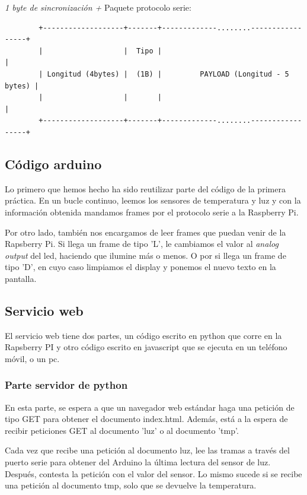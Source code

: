 \documentclass[]{article}
\begin{document}
\textit{1 byte de sincronización +}
Paquete protocolo serie:
\begin{verbatim}
		+-------------------+-------+-------------........-----------------+
		|                   |  Tipo |                                      |
		| Longitud (4bytes) |  (1B) |         PAYLOAD (Longitud - 5 bytes) |
		|                   |       |                                      |
		+-------------------+-------+-------------........-----------------+
\end{verbatim}


\subsection{Código arduino}

Lo primero que hemos hecho ha sido reutilizar parte del código de la primera práctica. En un bucle continuo, leemos los sensores de temperatura y luz y con la información obtenida mandamos frames por el protocolo serie a la Raspberry Pi.

\hfill

Por otro lado, también nos encargamos de leer frames que puedan venir de la Rapsberry Pi. Si llega un frame de tipo 'L', le cambiamos el valor al \textit{analog output} del led, haciendo que ilumine más o menos. O por si llega un frame de tipo 'D', en cuyo caso limpiamos el display y ponemos el nuevo texto en la pantalla.

\subsection{Servicio web}
El servicio web tiene dos partes, un código escrito en python que corre en la Rapsberry PI y otro código escrito en javascript que se ejecuta en un teléfono móvil, o un pc.

\subsubsection{Parte servidor de python}
En esta parte, se espera a que un navegador web estándar haga una petición de tipo GET para obtener el documento index.html. Además, está a la espera de recibir peticiones GET al documento 'luz' o al documento 'tmp'.

\hfill

Cada vez que recibe una petición al documento luz, lee las tramas a través del puerto serie para obtener del Arduino la última lectura del sensor de luz. Después, contesta la petición con el valor del sensor. Lo mismo sucede si se recibe una petición al documento tmp, solo que se devuelve la temperatura.
\end{document}
